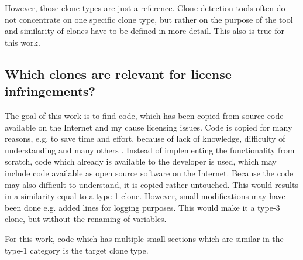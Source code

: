 However, those clone types are just a reference.
Clone detection tools often do not concentrate on one specific clone type, but rather on the purpose of the tool and similarity of clones have to be defined in more detail.
This also is true for this work.

\subsection*{Which clones are relevant for license infringements?}
The goal of this work is to find code, which has been copied from source code available on the Internet and my cause licensing issues.
Code is copied for many reasons, e.g. to save time and effort, because of lack of knowledge, difficulty of understanding and many others \cite{roy2007survey}.
Instead of implementing the functionality from scratch, code which already is available to the developer is used, which may include code available as open source software on the Internet.
Because the code may also difficult to understand, it is copied rather untouched.
This would results in a similarity equal to a type-1 clone.
However, small modifications may have been done e.g. added lines for logging purposes.
This would make it a type-3 clone, but without the renaming of variables.

For this work, code which has multiple small sections which are similar in the type-1 category is the target clone type.


